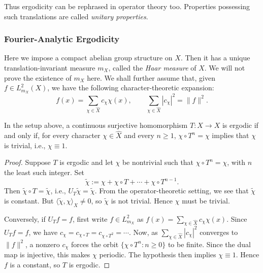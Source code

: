 \documentclass[11pt,a4paper]{article}
\begin{document}
\begin{remark}
Thus ergodicity can be rephrased in operator theory too. Properties possessing
such translations are called \emph{unitary properties}.
\end{remark}

\subsubsection{Fourier-Analytic Ergodicity}
Here we impose a compact abelian group structure on $X$. Then it has a unique
translation-invariant measure $m_X$, called the \emph{Haar measure} of $X$.
We will not prove the existence of $m_X$ here. We shall further assume that,
given $f\in L^2_{m_X}(X)$, we have the following character-theoretic expansion:
\[
  f(x)=\sum_{\chi\in\widehat X}c_\chi\chi(x),
  \qquad \sum_{\chi\in\widehat X}|c_\chi|^2=\|f\|^2.
\]

\setcounter{theorem}{7}\begin{proposition}\label{prop:ergodicity-fourier}
In the setup above, a continuous surjective homomorphism $T\colon X\to X$
is ergodic if and only if, for every character $\chi\in\widehat X$ and every
$n\geq1$, $\chi\circ T^n=\chi$ implies that $\chi$ is trivial, i.e.,
$\chi\equiv1$.
\end{proposition}
\begin{proof}
Suppose $T$ is ergodic and let $\chi$ be nontrivial such that
$\chi\circ T^n=\chi$, with $n$ the least such integer. Set
\[
  \widetilde\chi:=\chi+\chi\circ T+\cdots+\chi\circ T^{n-1}.
\]
Then $\widetilde\chi\circ T=\widetilde\chi$, i.e.,
$U_T\widetilde\chi=\widetilde\chi$. From the operator-theoretic setting,
we see that $\widetilde\chi$ is constant. But
$\langle\widetilde\chi,\chi\rangle_X\neq0$, so $\widetilde\chi$ is not trivial.
Hence $\chi$ must be trivial.

Conversely, if $U_Tf=f$, first write $f\in L^2_{m_X}$ as
$f(x)=\sum_{\chi\in\widehat X}c_\chi\chi(x)$. Since $U_Tf=f$, we have
$c_\chi=c_{\chi\circ T}=c_{\chi\circ T^2}=\cdots$.
Now, as $\sum_{\chi\in\widehat X}|c_\chi|^2$ converges to $\|f\|^2$, a
nonzero $c_\chi$ forces the orbit $\{\chi\circ T^n:n\geq0\}$ to be finite.
Since the dual map is injective, this makes $\chi$ periodic. The hypothesis
then implies $\chi\equiv1$. Hence $f$ is a constant, so $T$ is ergodic.
\end{proof}
\end{document}
